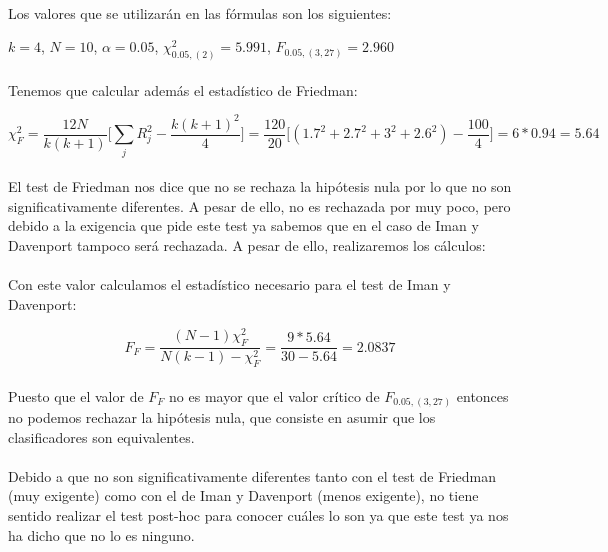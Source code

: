 \documentclass[10pt, a4paper,spanish]{article}
\begin{document}
		\paragraph{}
		Los valores que se utilizarán en las fórmulas son los siguientes:

		$k = 4$, $N =10$,
		$\alpha = 0.05$,
		$\chi_{0.05,(2)}^2= 5.991$,
		$F_{0.05, (3,27)} =  2.960$

		\paragraph{}
		Tenemos que calcular además el estadístico de Friedman:

		\[
		\chi_{F}^2 = \frac{12N}{k(k+1)}\Big[\displaystyle\sum_{j}R_{j}^2 - \frac{k(k+1)^2}{4}\Big] = \frac{120}{20}\Big[(1.7^2+ 2.7^2+3^2+2.6^2) - \frac{100}{4}\Big] = 6 * 0.94 = 5.64\]

		\paragraph{}
		El test de Friedman nos dice que no se rechaza la hipótesis nula por lo que no son significativamente diferentes. A pesar de ello, no es rechazada por muy poco, pero debido a la exigencia que pide este test ya sabemos que en el caso de Iman y Davenport tampoco será rechazada. A pesar de ello, realizaremos los cálculos:

		\paragraph{}
		Con este valor calculamos el estadístico necesario para el test de Iman y Davenport:

		\[F_{F}= \frac{(N-1)\chi_{F}^2}{N(k-1)-\chi_{F}^2} = \frac{9 * 5.64}{30-5.64} = 2.0837 \]

		\paragraph{}
		Puesto que el valor de $F_{F}$ no es mayor que el valor crítico de $F_{0.05, (3,27)}$ entonces no podemos rechazar la hipótesis nula, que consiste en asumir que los clasificadores son equivalentes.

		\paragraph{}
		Debido a que no son significativamente diferentes tanto con el test de Friedman (muy exigente) como con el de Iman y Davenport (menos exigente), no tiene sentido realizar el test post-hoc para conocer cuáles lo son ya que este test ya nos ha dicho que no lo es ninguno.
\end{document}
